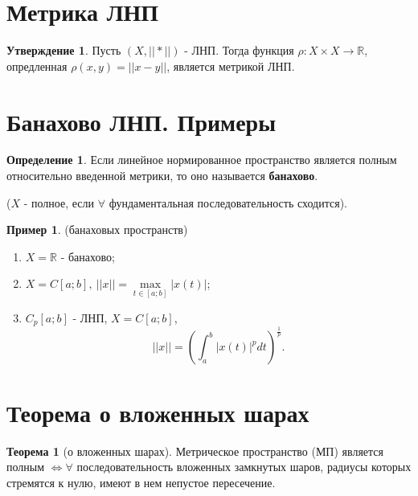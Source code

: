 \documentclass{report}
\theoremstyle{definition}
\newtheorem*{definition}{Определение}
\newtheorem*{example}{Пример}
\newtheorem*{statement}{Утверждение}
\newtheorem*{theorem}{Теорема}
\begin{document}
\section{Метрика ЛНП}

\begin{statement}
    Пусть $(X,|| * ||)$ - ЛНП. Тогда функция $\rho: X \times X \rightarrow \mathbb{R}$, опредленная $\rho(x,y)
        = || x-y ||$, является метрикой ЛНП.
\end{statement}

\section{Банахово ЛНП. Примеры}

\begin{definition}
    Если линейное нормированное пространство является полным относительно введенной метрики, то оно называется
    \textbf{банахово}.

    ($X$ - полное, если $\forall$ фундаментальная последовательность сходится).
\end{definition}

\begin{example}
    (банаховых пространств)

    \begin{enumerate}
        \item $X = \mathbb{R}$ - банахово;
        \item $X = C[a;b], \ ||x|| = \underset{t \in [a;b]}{\max}|x(t)|$;
        \item $C_p[a;b]$ - ЛНП, $X = C[a;b]$,
              \begin{equation*}
                  ||x|| = (\int_{a}^{b}|x(t)|^p dt)^\frac{1}{p}.
              \end{equation*}
    \end{enumerate}
\end{example}

\section{Теорема о вложенных шарах}

\begin{theorem}[о вложенных шарах]
    Метрическое пространство (МП) является полным $\iff \forall$ последовательность вложенных замкнутых шаров,
    радиусы которых стремятся к нулю, имеют в нем непустое пересечение.
\end{theorem}
\end{document}
